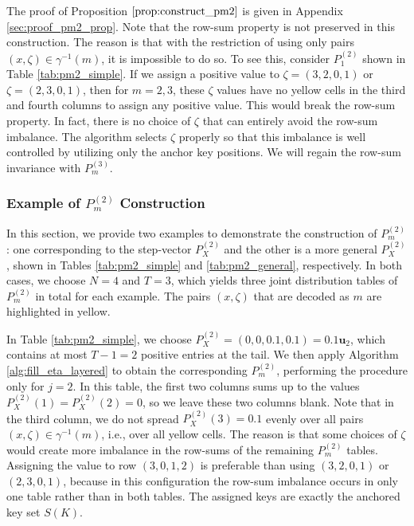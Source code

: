 \documentclass[11pt,letterpaper]{article}
\begin{document}
The proof of Proposition $\ref{prop:construct_pm2}$ is given in Appendix \ref{sec:proof_pm2_prop}.
Note that the row-sum property is not preserved in this construction. The reason is that with the restriction of using only pairs $(x, \zeta) \in \gamma^{-1}(m)$, it is impossible to do so. 
To see this, consider $P_1^{(2)}$ shown in Table \ref{tab:pm2_simple}. If we assign a positive value to $\zeta = (3,2,0,1)$ or $\zeta = (2,3,0,1)$, then for $m = 2,3$, these $\zeta$ values have no yellow cells in the third and fourth columns to assign any positive value. This would break the row-sum property. In fact, there is no choice of $\zeta$ that can entirely avoid the row-sum imbalance. The algorithm selects $\zeta$ properly so that this imbalance is well controlled by utilizing only the anchor key positions. We will regain the row-sum invariance with $P_m^{(3)}$. 


\subsubsection{Example of $P_m^{(2)}$ Construction }

In this section, we provide two examples to demonstrate the construction of $P_m^{(2)}$: one corresponding to the step-vector $P_X^{(2)}$ and the other is a more general $P_X^{(2)}$, shown in Tables \ref{tab:pm2_simple} and \ref{tab:pm2_general}, respectively. In both cases, we choose $N = 4$ and $T = 3$, which yields three joint distribution tables of $P_m^{(2)}$ in total for each example. The pairs $(x,\zeta)$ that are decoded as $m$ are highlighted in yellow.

In Table \ref{tab:pm2_simple}, we choose $P_X^{(2)} = (0,0,0.1,0.1) = 0.1\boldsymbol{u}_2$, which contains at most $T-1 = 2$ positive entries at the tail. We then apply Algorithm \ref{alg:fill_eta_layered} to obtain the corresponding $P_m^{(2)}$, performing the procedure only for $j = 2$. In this table, the first two columns sums up to the values $P_X^{(2)}(1)=P_X^{(2)}(2)=0$, so we leave these two columns blank. Note that in the third column, we do not spread $P_X^{(2)}(3) = 0.1$ evenly over all pairs $(x,\zeta) \in \gamma^{-1}(m)$, i.e., over all yellow cells. The reason is that some choices of $\zeta$ would create more imbalance in the row-sums of the remaining $P_m^{(2)}$ tables. Assigning the value to row $(3, 0, 1,2)$ is preferable than using $(3,2,0,1)$ or $(2,3,0,1)$, because in this configuration the row-sum imbalance occurs in only one table rather than in both tables. The assigned keys are exactly the anchored key set $S(K)$.
\end{document}
